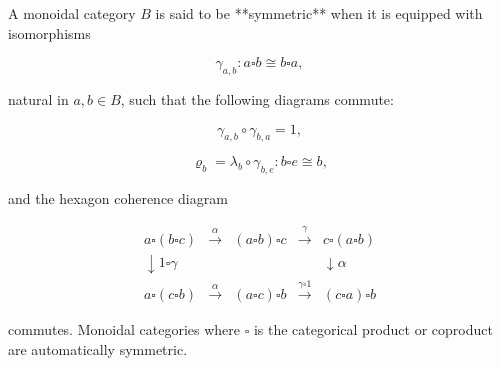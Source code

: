A monoidal category $B$ is said to be **symmetric** when it is equipped with isomorphisms

$$\gamma_{a,b} : a \square b \cong b \square a,$$

natural in $a, b \in B$, such that the following diagrams commute:

$$\gamma_{a,b} \circ \gamma_{b,a} = 1,$$

$$\varrho_b = \lambda_b \circ \gamma_{b,e} : b \square e \cong b,$$

and the hexagon coherence diagram

$$\begin{array}{ccc}
a \square (b \square c) & \xrightarrow{\alpha} & (a \square b) \square c & \xrightarrow{\gamma} & c \square (a \square b) \\
\downarrow {\scriptstyle 1 \square \gamma} & & & & \downarrow {\scriptstyle \alpha} \\
a \square (c \square b) & \xrightarrow{\alpha} & (a \square c) \square b & \xrightarrow{\gamma \square 1} & (c \square a) \square b
\end{array}$$

commutes. Monoidal categories where $\square$ is the categorical product or coproduct are automatically symmetric.
